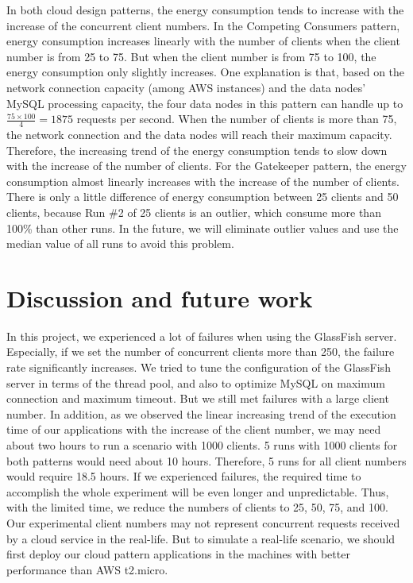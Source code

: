 \documentclass{article}
\begin{document}
In both cloud design patterns, the energy consumption tends to increase with the increase of the concurrent client numbers. In the Competing Consumers pattern, energy consumption increases linearly with the number of clients when the client number is from 25 to 75. But when the client number is from 75 to 100, the energy consumption only slightly increases. One explanation is that, based on the network connection capacity (among AWS instances) and the data nodes' MySQL processing capacity, the four data nodes in this pattern can handle up to $\frac{75\times100}{4}=1875$ requests per second. When the number of clients is more than 75, the network connection and the data nodes will reach their maximum capacity. Therefore, the increasing trend of the energy consumption tends to slow down with the increase of the number of clients. For the Gatekeeper pattern, the energy consumption almost linearly increases with the increase of the number of clients. There is only a little difference of energy consumption between 25 clients and 50 clients, because Run \#2 of 25 clients is an outlier, which consume more than 100\% than other runs. In the future, we will eliminate outlier values and use the median value of all runs to avoid this problem.

\section{Discussion and future work}
In this project, we experienced a lot of failures when using the GlassFish server. Especially, if we set the number of concurrent clients more than 250, the failure rate significantly increases. We tried to tune the configuration of the GlassFish server in terms of the thread pool, and also to optimize MySQL on maximum connection and maximum timeout. But we still met failures with a large client number. In addition, as we observed the linear increasing trend of the execution time of our applications with the increase of the client number, we may need about two hours to run a scenario with 1000 clients. 5 runs with 1000 clients for both patterns would need about 10 hours. Therefore, 5 runs for all client numbers would require 18.5 hours. If we experienced failures, the required time to accomplish the whole experiment will be even longer and unpredictable. Thus, with the limited time, we reduce the numbers of clients to 25, 50, 75, and 100. Our experimental client numbers may not represent concurrent requests received by a cloud service in the real-life. But to simulate a real-life scenario, we should first deploy our cloud pattern applications in the machines with better performance than AWS t2.micro. \\
\end{document}
